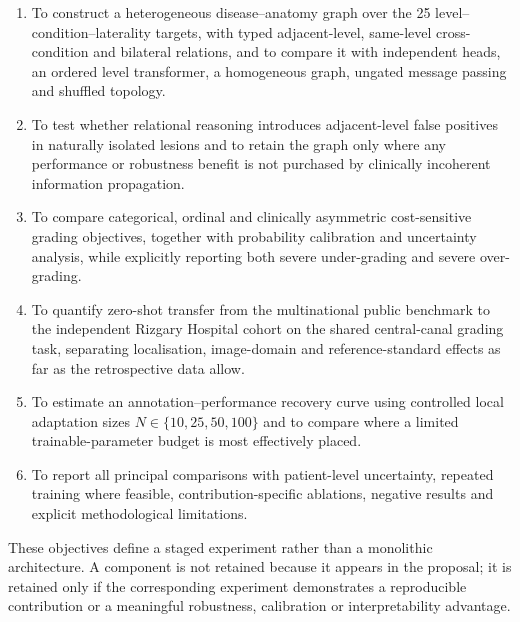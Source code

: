 \begin{enumerate}
  \item To construct a heterogeneous disease--anatomy graph over the 25
        level--condition--laterality targets, with typed adjacent-level,
        same-level cross-condition and bilateral relations, and to compare it with
        independent heads, an ordered level transformer, a homogeneous graph,
        ungated message passing and shuffled topology.

  \item To test whether relational reasoning introduces adjacent-level false
        positives in naturally isolated lesions and to retain the graph only where
        any performance or robustness benefit is not purchased by clinically
        incoherent information propagation.

  \item To compare categorical, ordinal and clinically asymmetric cost-sensitive
        grading objectives, together with probability calibration and uncertainty
        analysis, while explicitly reporting both severe under-grading and severe
        over-grading.

  \item To quantify zero-shot transfer from the multinational public benchmark to
        the independent Rizgary Hospital cohort on the shared central-canal grading
        task, separating localisation, image-domain and reference-standard effects
        as far as the retrospective data allow.

  \item To estimate an annotation--performance recovery curve using controlled
        local adaptation sizes $N\in\{10,25,50,100\}$ and to compare where a limited
        trainable-parameter budget is most effectively placed.

  \item To report all principal comparisons with patient-level uncertainty,
        repeated training where feasible, contribution-specific ablations, negative
        results and explicit methodological limitations.
\end{enumerate}

These objectives define a staged experiment rather than a monolithic architecture.
A component is not retained because it appears in the proposal; it is retained only
if the corresponding experiment demonstrates a reproducible contribution or a
meaningful robustness, calibration or interpretability advantage.

